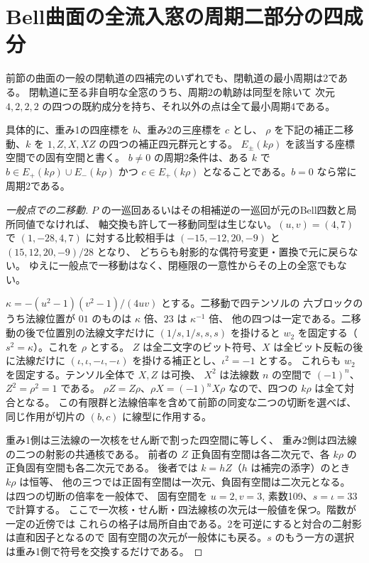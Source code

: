 \section{Bell曲面の全流入窓の周期二部分の四成分}
\label{sec:split-surface-periods}
\begin{theorem}\label{thm:split-surface-periods}
前節の曲面の一般の閉軌道の四補完のいずれでも、閉軌道の最小周期は2である。
閉軌道に至る非自明な全窓のうち、周期2の軌跡は同型を除いて
次元 $4,2,2,2$ の四つの既約成分を持ち、それ以外の点は全て最小周期4である。

具体的に、重み1の四座標を $b$、重み2の三座標を $c$ とし、
$\rho$ を下記の補正二移動、$k$ を $1,Z,X,XZ$ の四つの補正四元群元とする。
$E_\pm(k\rho)$ を該当する座標空間での固有空間と書く。
$b\ne0$ の周期2条件は、ある $k$ で $b\in E_+(k\rho)\cup E_-(k\rho)$ かつ
$c\in E_+(k\rho)$ となることである。$b=0$ なら常に周期2である。
\end{theorem}
\begin{proof}[一般点での二移動]
$P$ の一巡回あるいはその相補逆の一巡回が元のBell四数と局所同値でなければ、
軸交換も許して一移動同型は生じない。$(u,v)=(4,7)$ で
$(1,-28,4,7)$ に対する比較相手は $(-15,-12,20,-9)$ と $(15,12,20,-9)/28$ となり、
どちらも射影的な偶符号変更・置換で元に戻らない。
ゆえに一般点で一移動はなく、閉極限の一意性からその上の全窓でもない。

$\kappa=-(u^2-1)(v^2-1)/(4uv)$ とする。二移動で四テンソルの
六ブロックのうち法線位置が $01$ のものは $\kappa$ 倍、$23$ は $\kappa^{-1}$ 倍、
他の四つは一定である。二移動の後で位置別の法線文字だけに
$(1/s,1/s,s,s)$ を掛けると $w_2$ を固定する（$s^2=\kappa$）。これを $\rho$ とする。
$Z$ は全二文字のビット符号、$X$ は全ビット反転の後に法線だけに
$(\iota,\iota,-\iota,-\iota)$ を掛ける補正とし、$\iota^2=-1$ とする。
これらも $w_2$ を固定する。テンソル全体で $X,Z$ は可換、
$X^2$ は法線数 $n$ の空間で $(-1)^n$、$Z^2=\rho^2=1$ である。
$\rho Z=Z\rho$、$\rho X=(-1)^n X\rho$ なので、四つの $k\rho$ は全て対合となる。
この有限群と法線倍率を含めて前節の同変な二つの切断を選べば、
同じ作用が切片の $(b,c)$ に線型に作用する。

重み1側は三法線の一次核をせん断で割った四空間に等しく、
重み2側は四法線の二つの射影の共通核である。
前者の $Z$ 正負固有空間は各二次元で、各 $k\rho$ の正負固有空間も各二次元である。
後者では $k=hZ$（$h$ は補完の添字）のとき $k\rho$ は恒等、
他の三つでは正固有空間は一次元、負固有空間は二次元となる。
 は四つの切断の倍率を一般体で、
固有空間を $u=2,v=3$, 素数109、$s=\iota=33$ で計算する。
ここで一次核・せん断・四法線核の次元は一般値を保つ。階数が一定の近傍では
これらの格子は局所自由である。2を可逆にすると対合の二射影は直和因子となるので
固有空間の次元が一般体にも戻る。$s$ のもう一方の選択は重み1側で符号を交換するだけである。
\end{proof}
